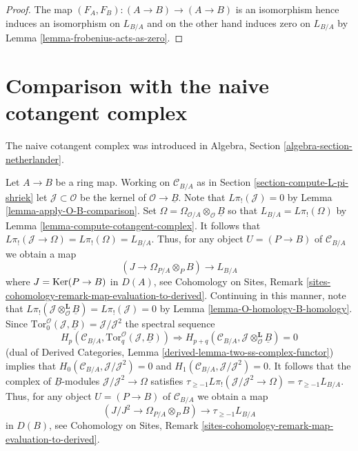 \begin{proof}
The map $(F_A, F_B) : (A \to B) \to (A \to B)$ is an isomorphism
hence induces an isomorphism on $L_{B/A}$ and on the other hand
induces zero on $L_{B/A}$ by Lemma \ref{lemma-frobenius-acts-as-zero}.
\end{proof}





\section{Comparison with the naive cotangent complex}
\label{section-surjections}

\noindent
The naive cotangent complex was introduced in
Algebra, Section \ref{algebra-section-netherlander}.

\begin{remark}
\label{remark-make-map}
Let $A \to B$ be a ring map.  Working on $\mathcal{C}_{B/A}$ as in
Section \ref{section-compute-L-pi-shriek} let
$\mathcal{J} \subset \mathcal{O}$ be the kernel of
$\mathcal{O} \to \underline{B}$. Note that $L\pi_!(\mathcal{J}) = 0$ by
Lemma \ref{lemma-apply-O-B-comparison}. Set
$\Omega =  \Omega_{\mathcal{O}/A} \otimes_\mathcal{O} \underline{B}$
so that
$L_{B/A} = L\pi_!(\Omega)$ by Lemma \ref{lemma-compute-cotangent-complex}.
It follows that $L\pi_!(\mathcal{J} \to \Omega) = L\pi_!(\Omega) = L_{B/A}$.
Thus, for any object $U = (P \to B)$ of $\mathcal{C}_{B/A}$ we obtain a map
\begin{equation}
\label{equation-comparison-map-A}
(J \to \Omega_{P/A} \otimes_P B) \longrightarrow L_{B/A}
\end{equation}
where $J = \mathop{\mathrm{Ker}}(P \to B)$ in $D(A)$, see
Cohomology on Sites, Remark
\ref{sites-cohomology-remark-map-evaluation-to-derived}.
Continuing in this manner, note that
$L\pi_!(\mathcal{J} \otimes_\mathcal{O}^\mathbf{L} \underline{B}) =
L\pi_!(\mathcal{J}) = 0$ by
Lemma \ref{lemma-O-homology-B-homology}.
Since $\text{Tor}_0^\mathcal{O}(\mathcal{J}, \underline{B}) =
\mathcal{J}/\mathcal{J}^2$
the spectral sequence
$$
H_p(\mathcal{C}_{B/A}, \text{Tor}_q^\mathcal{O}(\mathcal{J}, \underline{B}))
\Rightarrow 
H_{p + q}(\mathcal{C}_{B/A},
\mathcal{J} \otimes_\mathcal{O}^\mathbf{L} \underline{B}) = 0
$$
(dual of
Derived Categories, Lemma \ref{derived-lemma-two-ss-complex-functor})
implies that
$H_0(\mathcal{C}_{B/A}, \mathcal{J}/\mathcal{J}^2) = 0$
and $H_1(\mathcal{C}_{B/A}, \mathcal{J}/\mathcal{J}^2) = 0$.
It follows that the complex of $\underline{B}$-modules
$\mathcal{J}/\mathcal{J}^2 \to \Omega$ satisfies
$\tau_{\geq -1}L\pi_!(\mathcal{J}/\mathcal{J}^2 \to \Omega) =
\tau_{\geq -1}L_{B/A}$.
Thus, for any object $U = (P \to B)$ of $\mathcal{C}_{B/A}$ we obtain a map
\begin{equation}
\label{equation-comparison-map}
(J/J^2 \to \Omega_{P/A} \otimes_P B) \longrightarrow \tau_{\geq -1}L_{B/A}
\end{equation}
in $D(B)$, see
Cohomology on Sites, Remark
\ref{sites-cohomology-remark-map-evaluation-to-derived}.
\end{remark}

